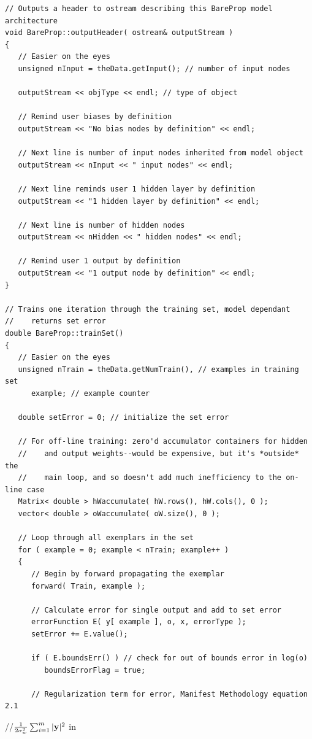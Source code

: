 \documentclass{report}[10pt]
\begin{document}
\begin{verbatim}
// Outputs a header to ostream describing this BareProp model architecture
void BareProp::outputHeader( ostream& outputStream )
{
   // Easier on the eyes
   unsigned nInput = theData.getInput(); // number of input nodes
   
   outputStream << objType << endl; // type of object
   
   // Remind user biases by definition
   outputStream << "No bias nodes by definition" << endl;

   // Next line is number of input nodes inherited from model object
   outputStream << nInput << " input nodes" << endl;

   // Next line reminds user 1 hidden layer by definition
   outputStream << "1 hidden layer by definition" << endl;

   // Next line is number of hidden nodes
   outputStream << nHidden << " hidden nodes" << endl;

   // Remind user 1 output by definition
   outputStream << "1 output node by definition" << endl;
}

// Trains one iteration through the training set, model dependant
//    returns set error
double BareProp::trainSet()
{
   // Easier on the eyes
   unsigned nTrain = theData.getNumTrain(), // examples in training set
      example; // example counter

   double setError = 0; // initialize the set error

   // For off-line training: zero'd accumulator containers for hidden
   //    and output weights--would be expensive, but it's *outside* the
   //    main loop, and so doesn't add much inefficiency to the on-line case
   Matrix< double > hWaccumulate( hW.rows(), hW.cols(), 0 );
   vector< double > oWaccumulate( oW.size(), 0 );
   
   // Loop through all exemplars in the set
   for ( example = 0; example < nTrain; example++ )
   {
      // Begin by forward propagating the exemplar
      forward( Train, example );

      // Calculate error for single output and add to set error
      errorFunction E( y[ example ], o, x, errorType );
      setError += E.value();

      if ( E.boundsErr() ) // check for out of bounds error in log(o)
         boundsErrorFlag = true;

      // Regularization term for error, Manifest Methodology equation 2.1
\end{verbatim}
\hspace{24 pt}//\hspace{16 pt}$\frac{1}{2\sigma_w^2} \sum_{i=1}^m |{\bf y}|^2$ in
\end{document}
